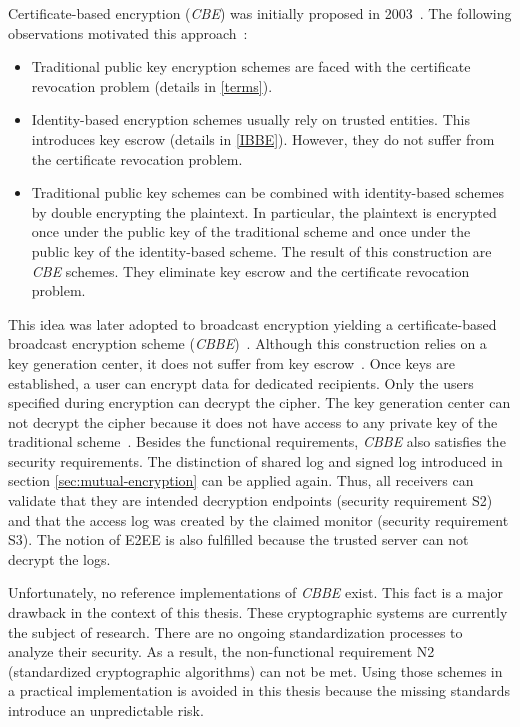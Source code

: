 \documentclass[../main.tex]{subfiles}
\begin{document}
Certificate-based encryption (\textit{CBE}) was initially proposed in 2003~\cite{Gentry2003}. 
The following observations motivated this approach~\cite{Hagg2022}:
\begin{itemize}
    \item 
    Traditional public key encryption schemes are faced with the certificate revocation problem (details in \cref{terms}).
    \item 
    Identity-based encryption schemes usually rely on trusted entities. 
    This introduces key escrow (details in \cref{IBBE}).
    However, they do not suffer from the certificate revocation problem.
    \item 
    Traditional public key schemes can be combined with identity-based schemes by double encrypting the plaintext.
    In particular, the plaintext is encrypted once under the public key of the traditional scheme and once under the public key of the identity-based scheme.
    The result of this construction are \textit{CBE} schemes.
    They eliminate key escrow and the certificate revocation problem.
\end{itemize}

This idea was later adopted to broadcast encryption yielding a certificate-based broadcast encryption scheme (\textit{CBBE})~\cite{Li2018}.
Although this construction relies on a key generation center, it does not suffer from key escrow~\cite{Hagg2022}.
Once keys are established, a user can encrypt data for dedicated recipients.
Only the users specified during encryption can decrypt the cipher.
The key generation center can not decrypt the cipher because it does not have access to any private key of the traditional scheme~\cite{Hagg2022}.
Besides the functional requirements, \textit{CBBE} also satisfies the security requirements.
The distinction of shared log and signed log introduced in section \ref{sec:mutual-encryption} can be applied again.
Thus, all receivers can validate that they are intended decryption endpoints (security requirement S2) and that the access log was created by the claimed monitor (security requirement S3).
The notion of E2EE is also fulfilled because the trusted server can not decrypt the logs.

Unfortunately, no reference implementations of \textit{CBBE} exist.
This fact is a major drawback in the context of this thesis.
These cryptographic systems are currently the subject of research.
There are no ongoing standardization processes to analyze their security.
As a result, the non-functional requirement N2 (standardized cryptographic algorithms) can not be met.
Using those schemes in a practical implementation is avoided in this thesis because the missing standards introduce an unpredictable risk.
\end{document}

